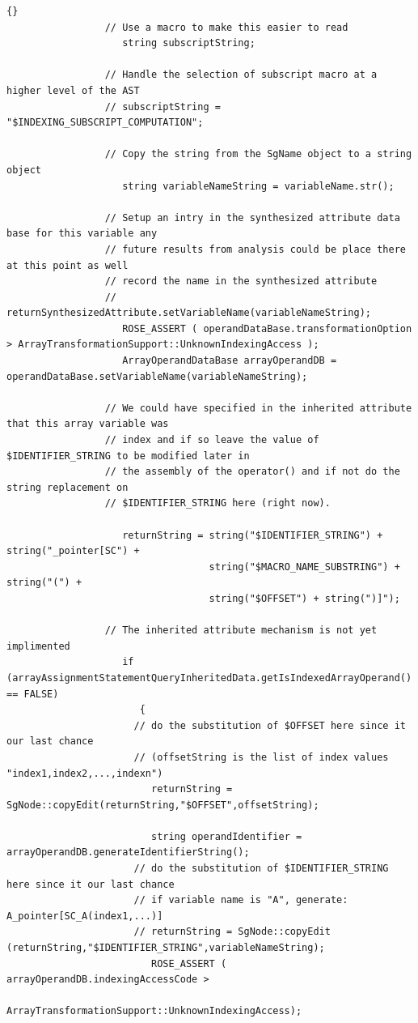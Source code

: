 \documentclass[10pt]{article}
\begin{document}
{\begin{lstlisting}{}
                 // Use a macro to make this easier to read
                    string subscriptString;

                 // Handle the selection of subscript macro at a higher level of the AST
                 // subscriptString = "$INDEXING_SUBSCRIPT_COMPUTATION";

                 // Copy the string from the SgName object to a string object
                    string variableNameString = variableName.str();

                 // Setup an intry in the synthesized attribute data base for this variable any
                 // future results from analysis could be place there at this point as well
                 // record the name in the synthesized attribute
                 // returnSynthesizedAttribute.setVariableName(variableNameString);
                    ROSE_ASSERT ( operandDataBase.transformationOption > ArrayTransformationSupport::UnknownIndexingAccess );
                    ArrayOperandDataBase arrayOperandDB = operandDataBase.setVariableName(variableNameString);

                 // We could have specified in the inherited attribute that this array variable was
                 // index and if so leave the value of $IDENTIFIER_STRING to be modified later in
                 // the assembly of the operator() and if not do the string replacement on
                 // $IDENTIFIER_STRING here (right now).

                    returnString = string("$IDENTIFIER_STRING") + string("_pointer[SC") + 
                                   string("$MACRO_NAME_SUBSTRING") + string("(") + 
                                   string("$OFFSET") + string(")]");

                 // The inherited attribute mechanism is not yet implimented
                    if (arrayAssignmentStatementQueryInheritedData.getIsIndexedArrayOperand() == FALSE)
                       {
                      // do the substitution of $OFFSET here since it our last chance
                      // (offsetString is the list of index values "index1,index2,...,indexn")
                         returnString = SgNode::copyEdit(returnString,"$OFFSET",offsetString);

                         string operandIdentifier = arrayOperandDB.generateIdentifierString();
                      // do the substitution of $IDENTIFIER_STRING here since it our last chance
                      // if variable name is "A", generate: A_pointer[SC_A(index1,...)]
                      // returnString = SgNode::copyEdit (returnString,"$IDENTIFIER_STRING",variableNameString);
                         ROSE_ASSERT ( arrayOperandDB.indexingAccessCode > 
                                       ArrayTransformationSupport::UnknownIndexingAccess);


\end{lstlisting}}
\end{document}
